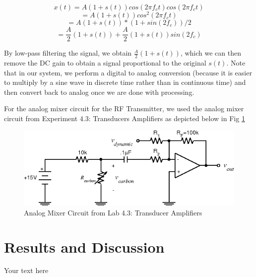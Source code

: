 \documentclass[10pt]{article}
\begin{document}
$$ x(t) = A(1 + s(t))cos(2\pi f_c  t)  cos(2  \pi  f_c  t)$$
$$ = A(1 + s(t))cos^2(2  \pi  f_c  t)$$
$$ = A(1 + s(t)) * (1 + sin(2f_c))/2$$
$$ = \frac{A}{2}(1 + s(t)) + \frac{A}{2}(1 + s(t))  sin(2f_c)$$

By low-pass filtering the signal, we obtain $ \frac{A}{2}(1 + s(t))$, which we can then remove the DC gain to obtain a signal proportional to the original $s(t)$. Note that in our system, we perform a digital to analog conversion (because it is easier to multiply by a sine wave in discrete time rather than in continuous time) and then convert back to analog once we are done with processing.  



\noindent
For the analog mixer circuit for the RF Transmitter, we used the analog mixer circuit from Experiment 4.3: Transducers Amplifiers as depicted below in Fig \ref{fig:analogmixer}

\begin{center}
	\begin{figure}[H]
		\centering
		\includegraphics[scale = 0.5]{images/analogmixer.png}
		\caption{Analog Mixer Circuit from Lab 4.3: Transducer Amplifiers}
		\label{fig:analogmixer}
	\end{figure}
\end{center}

\medskip


\section{Results and Discussion}

Your text here

\medskip
\end{document}
